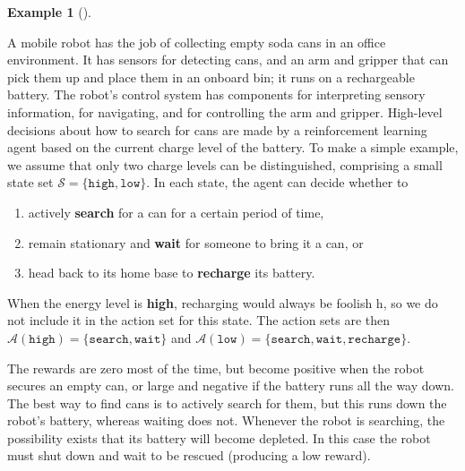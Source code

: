 \documentclass[
  letterpaper,
]{krantz}
\providecommand{\tightlist}{%
  \setlength{\itemsep}{0pt}\setlength{\parskip}{0pt}}\usepackage{longtable,booktabs,array}
\theoremstyle{plain}
\theoremstyle{definition}
\newtheorem{example}{Example}[chapter]
\theoremstyle{definition}
\theoremstyle{remark}
\begin{document}
\begin{example}[]\protect\hypertarget{exm-roboClean}{}\label{exm-roboClean}

A mobile robot has the job of collecting empty soda cans in an office
environment. It has sensors for detecting cans, and an arm and gripper
that can pick them up and place them in an onboard bin; it runs on a
rechargeable battery. The robot's control system has components for
interpreting sensory information, for navigating, and for controlling
the arm and gripper. High-level decisions about how to search for cans
are made by a reinforcement learning agent based on the current charge
level of the battery. To make a simple example, we assume that only two
charge levels can be distinguished, comprising a small state set
\(\mathcal{S} = \{\texttt{high}, \texttt{low} \}\). In each state, the
agent can decide whether to

\begin{enumerate}
\def\labelenumi{\arabic{enumi}.}
\tightlist
\item
  actively \textbf{search} for a can for a certain period of time,
\item
  remain stationary and \textbf{wait} for someone to bring it a can, or
\item
  head back to its home base to \textbf{recharge} its battery.
\end{enumerate}

When the energy level is \textbf{high}, recharging would always be
foolish h, so we do not include it in the action set for this state. The
action sets are then
\(\mathcal{A}(\texttt{high}) = \{\texttt{search}, \texttt{wait}\}\) and
\(\mathcal{A}(\texttt{low}) = \{\texttt{search}, \texttt{wait}, \texttt{recharge}\}\).

The rewards are zero most of the time, but become positive when the
robot secures an empty can, or large and negative if the battery runs
all the way down. The best way to find cans is to actively search for
them, but this runs down the robot's battery, whereas waiting does not.
Whenever the robot is searching, the possibility exists that its battery
will become depleted. In this case the robot must shut down and wait to
be rescued (producing a low reward).


\end{example}
\end{document}

